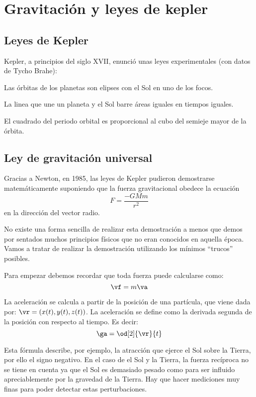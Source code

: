 
\chapter{Gravitación y leyes de kepler}
\section{Leyes de Kepler}

Kepler, a principios del siglo XVII, enunció unas leyes experimentales (con datos de Tycho Brahe):

\begin{lemma}
	Las órbitas de los planetas son elipses con el Sol en uno de los focos.
\end{lemma}

\begin{lemma}
	La linea que une un planeta y el Sol barre áreas iguales en tiempos iguales.
\end{lemma}

\begin{lemma}
	El cuadrado del periodo orbital es proporcional al cubo del semieje mayor de la órbita.
\end{lemma}

\section{Ley de gravitación universal}

Gracias a Newton, en 1985, las leyes de Kepler pudieron demostrarse matemáticamente suponiendo que la fuerza gravitacional obedece la ecuación
\[ F = \frac{-GMm}{r^2} \]
en la dirección del vector radio.

No existe una forma sencilla de realizar esta demostración a menos que demos por sentados muchos principios físicos que no eran conocidos en aquella época. Vamos a tratar de realizar la demostración utilizando los mínimos ``trucos'' posibles.

Para empezar debemos recordar que toda fuerza puede calcularse como:
$$ \vf = m\va$$

La aceleración se calcula a partir de la posición de una partícula, que viene dada por: $\vr = (x(t), y(t), z(t))$. La aceleración se define como la derivada segunda de la posición con respecto al tiempo. Es decir:
\[ \ga = \od[2]{\vr}{t} \]

Esta fórmula describe, por ejemplo, la atracción que ejerce el Sol sobre la Tierra, por ello el signo negativo. En el caso de el Sol y la Tierra, la fuerza recíproca no se tiene en cuenta ya que el Sol es demasiado pesado como para ser influido apreciablemente por la gravedad de la Tierra. Hay que hacer mediciones muy finas para poder detectar estas perturbaciones.

